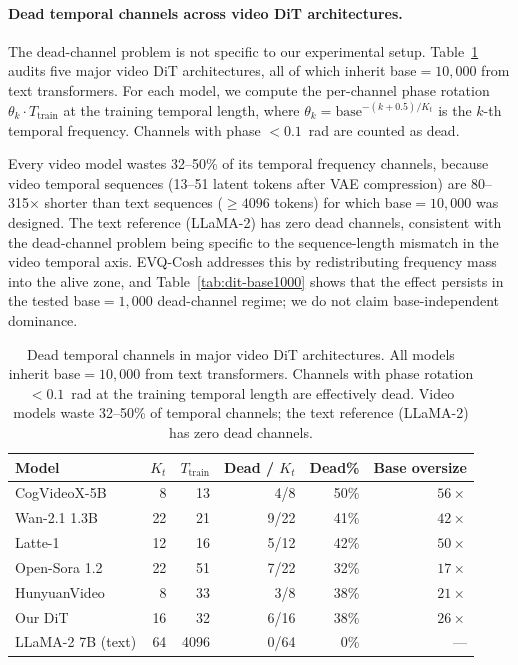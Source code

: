 \paragraph{Dead temporal channels across video DiT architectures.}
The dead-channel problem is not specific to our experimental setup. Table~\ref{tab:dead-channels} audits five major video DiT architectures, all of which inherit base${}=10{,}000$ from text transformers. For each model, we compute the per-channel phase rotation $\theta_k \cdot T_\text{train}$ at the training temporal length, where $\theta_k = \text{base}^{-(k+0.5)/K_t}$ is the $k$-th temporal frequency. Channels with phase $<0.1$~rad are counted as dead.

Every video model wastes 32--50\% of its temporal frequency channels, because video temporal sequences (13--51 latent tokens after VAE compression) are 80--315$\times$ shorter than text sequences (${\geq}4096$ tokens) for which base${}=10{,}000$ was designed. The text reference (LLaMA-2) has zero dead channels, consistent with the dead-channel problem being specific to the sequence-length mismatch in the video temporal axis. EVQ-Cosh addresses this by redistributing frequency mass into the alive zone, and Table~\ref{tab:dit-base1000} shows that the effect persists in the tested base${}=1{,}000$ dead-channel regime; we do not claim base-independent dominance.

\begin{table}[ht]
\caption{Dead temporal channels in major video DiT architectures. All models inherit base${}=10{,}000$ from text transformers. Channels with phase rotation $<0.1$~rad at the training temporal length are effectively dead. Video models waste 32--50\% of temporal channels; the text reference (LLaMA-2) has zero dead channels.}
\label{tab:dead-channels}
\centering
\small
\begin{tabular}{@{}l r r r r r@{}}
\toprule
Model & $K_t$ & $T_\text{train}$ & Dead / $K_t$ & Dead\% & Base oversize \\
\midrule
CogVideoX-5B \citep{yang2024cogvideox} & 8 & 13 & 4/8 & 50\% & $56\times$ \\
Wan-2.1 1.3B \citep{wan2025wan} & 22 & 21 & 9/22 & 41\% & $42\times$ \\
Latte-1 \citep{ma2024latte} & 12 & 16 & 5/12 & 42\% & $50\times$ \\
Open-Sora 1.2 \citep{opensora2024} & 22 & 51 & 7/22 & 32\% & $17\times$ \\
HunyuanVideo \citep{kong2024hunyuanvideo} & 8 & 33 & 3/8 & 38\% & $21\times$ \\
Our DiT & 16 & 32 & 6/16 & 38\% & $26\times$ \\
\midrule
LLaMA-2 7B \citep{touvron2023llama2} (text) & 64 & 4096 & 0/64 & 0\% & --- \\
\bottomrule
\end{tabular}
\end{table}

